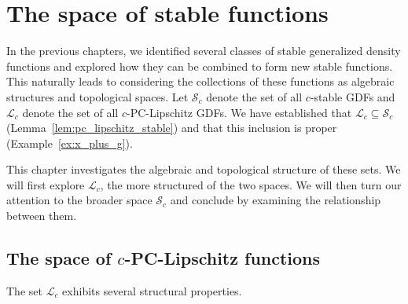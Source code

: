 \chapter{The space of stable functions}
\label{chap:space}

In the previous chapters, we identified several classes of stable generalized
density functions and explored how they can be combined to form new stable
functions.
This naturally leads to considering the collections of these functions as
algebraic structures and topological spaces.
Let $\mathcal{S}_c$ denote the set of all $c$-stable GDFs
and $\mathcal{L}_c$ denote the set of all $c$-PC-Lipschitz GDFs.
We have established that $\mathcal{L}_c \subseteq \mathcal{S}_c$
(Lemma~\ref{lem:pc_lipschitz_stable}) and that this inclusion is proper
(Example~\ref{ex:x_plus_g}).

This chapter investigates the algebraic and topological structure of these sets.
We will first explore $\mathcal{L}_c$, the more structured of the two spaces.
We will then turn our attention to the broader space $\mathcal{S}_c$ and
conclude by examining the relationship between them.

\section{The space of $c$-PC-Lipschitz functions}
\label{sec:space_pc_lipschitz}

The set $\mathcal{L}_c$ exhibits several structural properties.

